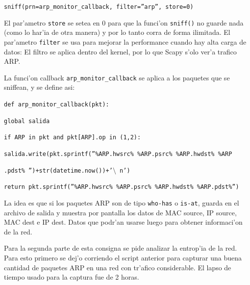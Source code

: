 \documentclass[a4paper,10pt]{article}
\begin{document}
\texttt{sniff(prn=arp\_monitor\_callback, filter=''arp'', store=0)}

\vspace*{5 mm}

El par'ametro \texttt{store} se setea en 0 para que la funci'on \texttt{sniff()} no guarde nada (como lo har'ia de otra manera) y por lo tanto corra de forma ilimitada. El par'ametro \texttt{filter} se usa para mejorar la performance cuando hay alta carga de datos: El filtro se aplica dentro del kernel, por lo que Scapy s'olo ver'a trafico ARP.

\vspace*{5 mm}

La funci'on callback \texttt{arp\_monitor\_callback} se aplica a los paquetes que se sniffean, y se define asi:

\vspace*{5 mm}

\texttt{def arp\_monitor\_callback(pkt):}

\hspace*{3 mm}	\texttt{global salida}
	
\hspace*{3 mm}	\texttt{if ARP in pkt and pkt[ARP].op in (1,2):}
		
\hspace*{6 mm}			\texttt{salida.write(pkt.sprintf(''\%ARP.hwsrc\% \%ARP.psrc\% \%ARP.hwdst\% \%ARP}
			
\hspace*{6 mm}			\texttt{.pdst\% '')+str(datetime.now())+'$\setminus$ n')}
			
\hspace*{6 mm}			\texttt{return pkt.sprintf(''\%ARP.hwsrc\% \%ARP.psrc\% \%ARP.hwdst\% \%ARP.pdst\%'')}

\vspace*{5 mm}

La idea es que si los paquetes ARP son de tipo \texttt{who-has} o \texttt{is-at}, guarda en el archivo de salida y muestra por pantalla los datos de MAC source, IP source, MAC dest e IP dest. Datos que podr'an usarse luego para obtener informaci'on de la red.

\vspace*{5 mm}

Para la segunda parte de esta consigna se pide analizar la entrop'ia de la red. Para esto primero se dej'o corriendo el script anterior para capturar una buena cantidad de paquetes ARP en una red con tr'afico considerable. El lapso de tiempo usado para la captura fue de 2 horas. 
\end{document}
